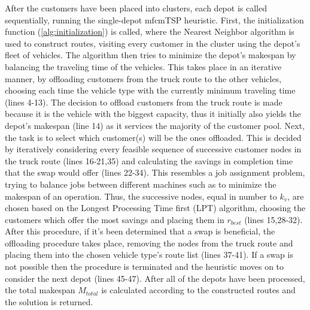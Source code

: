 \documentclass{article}
\begin{document}
	After the customers have been placed into clusters, each depot is called sequentially, running the single-depot mfcmTSP heuristic. First, the initialization function (\ref{alg:initialization}) is called, where the Nearest Neighbor algorithm is used to construct routes, visiting every customer in the cluster using the depot's fleet of vehicles. The algorithm then tries to minimize the depot's makespan by balancing the traveling time of the vehicles. This takes place in an iterative manner, by offloading customers from the truck route to the other vehicles, choosing each time the vehicle type with the currently minimum traveling time (lines 4-13). The decision to offload customers from the truck route is made because it is the vehicle with the biggest capacity, thus it initially also yields the depot's makespan (line 14) as it services the majority of the customer pool. Next, the task is to select which customer(s) will be the ones offloaded. This is decided by iteratively considering every feasible sequence of successive customer nodes in the truck route (lines 16-21,35) and calculating the savings in completion time that the swap would offer (lines 22-34). This resembles a job assignment problem, trying to balance jobs between different machines such as to minimize the makespan of an operation. Thus, the successive nodes, equal in number to $k_v$, are chosen based on the Longest Processing Time first (LPT) algorithm, choosing the customers which offer the most savings and placing them in $r_{best}$ (lines 15,28-32). After this procedure, if it's been determined that a swap is beneficial, the offloading procedure takes place, removing the nodes from the truck route and placing them into the chosen vehicle type's route list (lines 37-41). If a swap is not possible then the procedure is terminated and the heuristic moves on to consider the next depot (lines 45-47). After all of the depots have been processed, the total makespan $M_{total}$ is calculated according to the constructed routes and the solution is returned. 
	\par
\end{document}
